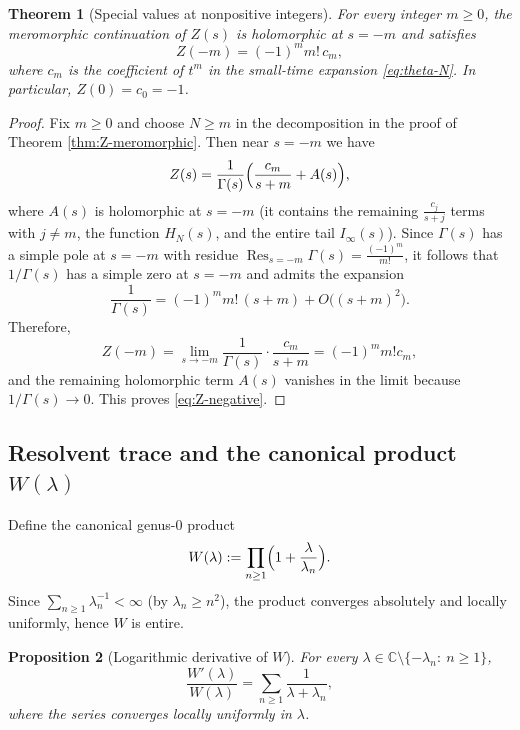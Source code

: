 \documentclass[11pt,letterpaper]{amsart}
\numberwithin{equation}{section}
\newtheorem{theorem}{Theorem}[section]
\newtheorem{proposition}[theorem]{Proposition}
\theoremstyle{definition}
\newcommand{\C}{\mathbb{C}}
\begin{document}
\begin{theorem}[Special values at nonpositive integers]\label{thm:Z-negative}
For every integer $m\ge 0$, the meromorphic continuation of $Z(s)$ is holomorphic at $s=-m$ and satisfies
\begin{equation}\label{eq:Z-negative}
Z(-m)=(-1)^m m!\,c_m,
\end{equation}
where $c_m$ is the coefficient of $t^m$ in the small-time expansion \eqref{eq:theta-N}.
In particular, $Z(0)=c_0=-1$.
\end{theorem}

\begin{proof}
Fix $m\ge 0$ and choose $N\ge m$ in the decomposition in the proof of Theorem \ref{thm:Z-meromorphic}.
Then near $s=-m$ we have
\[
Z(s)=\frac{1}{\Gamma(s)}\Bigl(\frac{c_m}{s+m} + A(s)\Bigr),
\]
where $A(s)$ is holomorphic at $s=-m$ (it contains the remaining $\frac{c_j}{s+j}$ terms with $j\ne m$,
the function $H_N(s)$, and the entire tail $I_\infty(s)$).
Since $\Gamma(s)$ has a simple pole at $s=-m$ with residue $\operatorname{Res}_{s=-m}\Gamma(s)=\frac{(-1)^m}{m!}$,
it follows that $1/\Gamma(s)$ has a simple zero at $s=-m$ and admits the expansion
\[
\frac{1}{\Gamma(s)} = (-1)^m m!\,(s+m) + O\bigl((s+m)^2\bigr).
\]
Therefore,
\[
Z(-m)=\lim_{s\to -m}\frac{1}{\Gamma(s)}\cdot \frac{c_m}{s+m}=(-1)^m m! c_m,
\]
and the remaining holomorphic term $A(s)$ vanishes in the limit because $1/\Gamma(s)\to 0$.
This proves \eqref{eq:Z-negative}.
\end{proof}

\subsection{Resolvent trace and the canonical product $W(\lambda)$}

Define the canonical genus-$0$ product
\begin{equation}\label{eq:def-W}
W(\lambda):=\prod_{n\ge 1}\Bigl(1+\frac{\lambda}{\lambda_n}\Bigr).
\end{equation}
Since $\sum_{n\ge 1}\lambda_n^{-1}<\infty$ (by $\lambda_n\ge n^2$), the product converges
absolutely and locally uniformly, hence $W$ is entire.

\begin{proposition}[Logarithmic derivative of $W$]\label{prop:log-derivative-W}
For every $\lambda\in\C\setminus\{-\lambda_n:\ n\ge 1\}$,
\begin{equation}\label{eq:Wprime-over-W}
\frac{W'(\lambda)}{W(\lambda)}=\sum_{n\ge 1}\frac{1}{\lambda+\lambda_n},
\end{equation}
where the series converges locally uniformly in $\lambda$.
\end{proposition}
\end{document}
